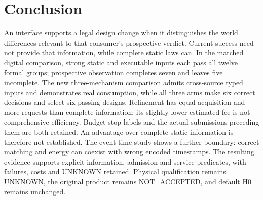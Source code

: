 \section{Conclusion}
An interface supports a legal design change when it distinguishes
the world differences relevant to that consumer's prospective
verdict. Current success need not provide that information, while
complete static laws can. In the matched digital comparison,
strong static and executable inputs each pass all twelve formal
groups; prospective observation completes seven and leaves five
incomplete. The new three-mechanism comparison admits cross-source
typed inputs and demonstrates real consumption, while all three arms
make six correct decisions and select six passing designs. Refinement
has equal acquisition and more requests than complete information;
its slightly lower estimated fee is not comprehensive efficiency.
Budget-stop labels and the actual submissions preceding them are
both retained. An advantage over complete static information is
therefore not established. The event-time
study shows a further boundary: correct matching and energy can
coexist with wrong encoded timestamps. The resulting evidence
supports explicit information, admission and service predicates,
with failures, costs and UNKNOWN retained. Physical qualification
remains UNKNOWN, the original product remains NOT\_ACCEPTED,
and default H0 remains unchanged.
